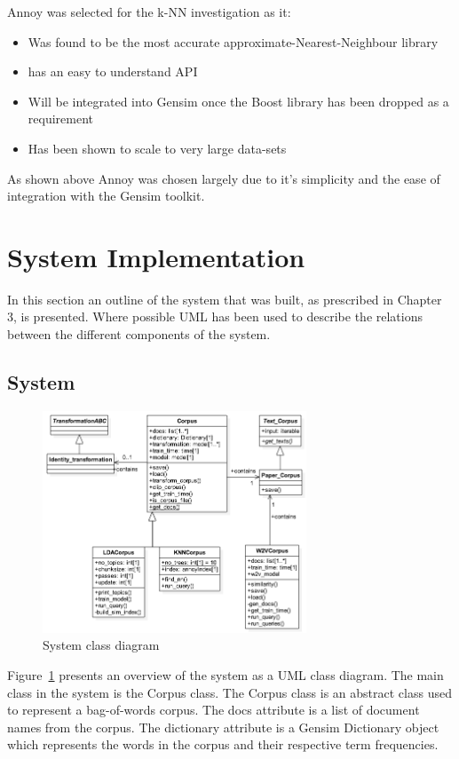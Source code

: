 Annoy was selected for the k-NN investigation as it:
\begin{itemize}
    \item Was found to be the most accurate approximate-Nearest-Neighbour library
    \item has an easy to understand API
    \item Will be integrated into Gensim once the Boost library has been dropped as a requirement
    \item Has been shown to scale to very large data-sets
\end{itemize}

As shown above Annoy was chosen largely due to it's simplicity and the ease of integration with the Gensim toolkit.

\section{System Implementation}
In this section an outline of the system that was built, as prescribed in Chapter 3, is presented.
Where possible UML has been used to describe the relations between the different components of the system.

\subsection{System}
\begin{figure}[h]
    \centering
        \includegraphics[width=0.7\textwidth]{Figures/FYPClassDiagram.png}
    \caption{System class diagram}
    \label{fig:UMLClass}
\end{figure}

Figure~\ref{fig:UMLClass} presents an overview of the system as a UML class diagram.
The main class in the system is the Corpus class.
The Corpus class is an abstract class used to represent a bag-of-words corpus.
The docs attribute is a list of document names from the corpus.
The dictionary attribute is a Gensim Dictionary object which represents the words in the corpus and their respective term frequencies.

